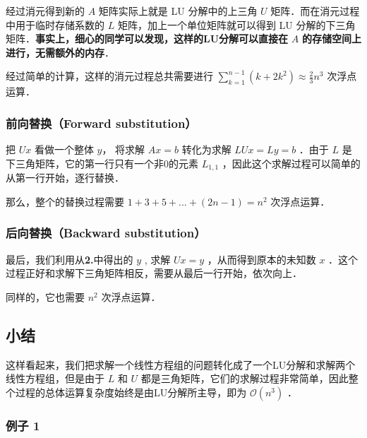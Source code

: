 经过消元得到新的 $A$ 矩阵实际上就是 LU 分解中的上三角 $U$ 矩阵．而在消元过程中用于临时存储系数的 $L$ 矩阵，加上一个单位矩阵就可以得到 LU 分解的下三角矩阵．\textbf{事实上，细心的同学可以发现，这样的LU分解可以直接在} $A$ \textbf{的存储空间上进行，无需额外的内存}．

经过简单的计算，这样的消元过程总共需要进行 $\sum_{k=1}^{n-1}(k+2k^2)\approx \frac{2}{3}n^3$ 次浮点运算．

\subsubsection{前向替换（Forward substitution）}

把 $Ux$ 看做一个整体 $y$， 将求解 $Ax=b$ 转化为求解 $LUx=Ly=b$ ．由于 $L $ 是下三角矩阵，它的第一行只有一个非0的元素 $L_{1,1}$ ，因此这个求解过程可以简单的从第一行开始，逐行替换．

那么，整个的替换过程需要 $1+3+5+...+(2n-1)=n^2$ 次浮点运算．

\subsubsection{后向替换（Backward substitution）}

最后，我们利用从\textbf{2.}中得出的 $y$ , 求解 $Ux=y$ ，从而得到原本的未知数 $x$ ．这个过程正好和求解下三角矩阵相反，需要从最后一行开始，依次向上．

同样的，它也需要 $n^2$ 次浮点运算．

\subsection{小结}

这样看起来，我们把求解一个线性方程组的问题转化成了一个LU分解和求解两个线性方程组，但是由于 $L$ 和 $U$ 都是三角矩阵，它们的求解过程非常简单，因此整个过程的总体运算复杂度始终是由LU分解所主导，即为 $\mathcal{O}(n^3)$ ．

\subsubsection{例子 1}

